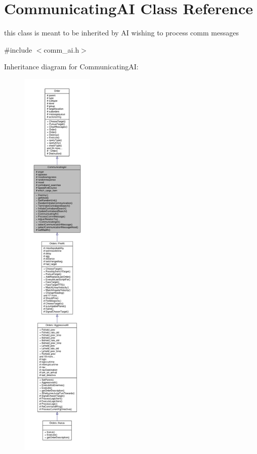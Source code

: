 \hypertarget{classCommunicatingAI}{}\section{Communicating\+AI Class Reference}
\label{classCommunicatingAI}


this class is meant to be inherited by AI wishing to process comm messages  




{\ttfamily \#include $<$comm\+\_\+ai.\+h$>$}



Inheritance diagram for Communicating\+AI\+:
\nopagebreak
\begin{figure}[H]
\begin{center}
\leavevmode
\includegraphics[height=550pt]{d9/d04/classCommunicatingAI__inherit__graph}
\end{center}
\end{figure}


